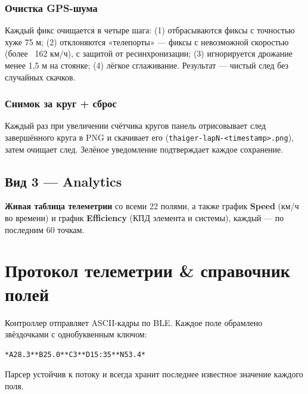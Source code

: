 \documentclass[11pt,a4paper,oneside]{report}
\newcommand{\code}[1]{\texttt{#1}}
\begin{document}
\subsubsection{Очистка GPS-шума}
Каждый фикс очищается в четыре шага: (1) отбрасываются фиксы с точностью хуже 75 м;
(2) отклоняются «телепорты» --- фиксы с невозможной скоростью (более ~162 км/ч), с
защитой от ресинхронизации; (3) игнорируется дрожание менее 1,5 м на стоянке;
(4) лёгкое сглаживание. Результат --- чистый след без случайных скачков.

\subsubsection{Снимок за круг + сброс}
Каждый раз при увеличении счётчика кругов панель отрисовывает след завершённого
круга в PNG и скачивает его (\code{thaiger-lapN-<timestamp>.png}), затем очищает
след.
Зелёное уведомление подтверждает каждое сохранение.

\subsection{Вид 3 --- Analytics}
\textbf{Живая таблица телеметрии} со всеми 22 полями, а также график \textbf{Speed}
(км/ч во времени) и график \textbf{Efficiency} (КПД элемента и системы), каждый ---
по последним 60 точкам.

\section{Протокол телеметрии \& справочник полей}
Контроллер отправляет ASCII-кадры по BLE. Каждое поле обрамлено звёздочками с
однобуквенным ключом:

\begin{lstlisting}
*A28.3**B25.0**C3**D15:35**N53.4*
\end{lstlisting}
Парсер устойчив к потоку и всегда хранит последнее известное значение каждого поля.
\end{document}
